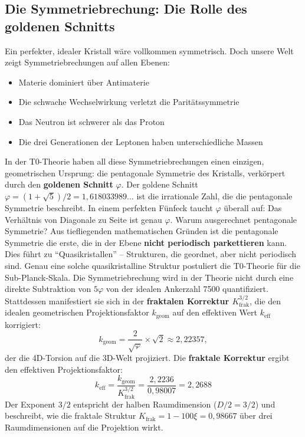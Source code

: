 	\subsection{Die Symmetriebrechung: Die Rolle des goldenen Schnitts}
	Ein perfekter, idealer Kristall wäre vollkommen symmetrisch. Doch unsere Welt zeigt Symmetriebrechungen auf allen Ebenen:
	\begin{itemize}
		\item Materie dominiert über Antimaterie
		\item Die schwache Wechselwirkung verletzt die Paritätssymmetrie
		\item Das Neutron ist schwerer als das Proton
		\item Die drei Generationen der Leptonen haben unterschiedliche Massen
	\end{itemize}
	In der T0-Theorie haben all diese Symmetriebrechungen einen einzigen, geometrischen Ursprung: die pentagonale Symmetrie des Kristalls, verkörpert durch den \textbf{goldenen Schnitt} \(\varphi\).
	Der goldene Schnitt \(\varphi = (1+\sqrt{5})/2 = 1{,}618033989\ldots\) ist die irrationale Zahl, die die pentagonale Symmetrie beschreibt. In einem perfekten Fünfeck taucht \(\varphi\) überall auf: Das Verhältnis von Diagonale zu Seite ist genau \(\varphi\).
	Warum ausgerechnet pentagonale Symmetrie? Aus tiefliegenden mathematischen Gründen ist die pentagonale Symmetrie die erste, die in der Ebene \textbf{nicht periodisch parkettieren} kann. Dies führt zu \enquote{Quasikristallen} -- Strukturen, die geordnet, aber nicht periodisch sind. Genau eine solche quasikristalline Struktur postuliert die T0-Theorie für die Sub-Planck-Skala.
	Die Symmetriebrechung wird in der Theorie nicht durch eine direkte Subtraktion von \(5\varphi\) von der idealen Ankerzahl 7500 quantifiziert. Stattdessen manifestiert sie sich in der \textbf{fraktalen Korrektur $K_\text{frak}^{3/2}$}, die den idealen geometrischen Projektionsfaktor \(k_\text{geom}\) auf den effektiven Wert \(k_\text{eff}\) korrigiert:
	\begin{equation}
		k_\text{geom} = \frac{2}{\sqrt{\varphi}} \times \sqrt{2} \approx 2{,}22357,
	\end{equation}
	der die 4D-Torsion auf die 3D-Welt projiziert. Die \textbf{fraktale Korrektur} ergibt den effektiven Projektionsfaktor:
	\begin{equation}
		k_\text{eff} = \frac{k_\text{geom}}{K_\text{frak}^{3/2}} = \frac{2{,}2236}{0{,}98007} = 2{,}2688
	\end{equation}
	Der Exponent $3/2$ entspricht der halben Raumdimension ($D/2 = 3/2$) und beschreibt, wie die fraktale Struktur $K_\text{frak} = 1 - 100\xi = 0{,}98667$ über drei Raumdimensionen auf die Projektion wirkt.
	
